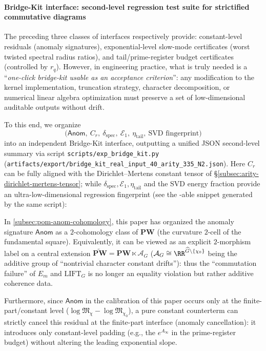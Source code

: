 \paragraph{Bridge-Kit interface: second-level regression test suite for strictified commutative diagrams}
The preceding three classes of interfaces respectively provide: constant-level residuals (anomaly signatures), exponential-level slow-mode certificates (worst twisted spectral radius ratios), and tail/prime-register budget certificates (controlled by \(r_q\)).
However, in engineering practice, what is truly needed is a ``\emph{one-click bridge-kit usable as an acceptance criterion}'': any modification to the kernel implementation, truncation strategy, character decomposition, or numerical linear algebra optimization must preserve a set of low-dimensional auditable outputs without drift.
\par
To this end, we organize
\[
\bigl(\mathsf{Anom},\ C_r,\ \delta_{\mathrm{spec}},\ \mathcal{E}_1,\ \eta_{\mathrm{tail}},\ \text{SVD fingerprint}\bigr)
\]
into an independent Bridge-Kit interface, outputting a unified JSON second-level summary via script
\texttt{scripts/exp\_bridge\_kit.py}
(\texttt{artifacts/export/bridge\_kit\_real\_input\_40\_arity\_335\_N2.json}).
Here \(C_r\) can be fully aligned with the Dirichlet--Mertens constant tensor of \S\ref{subsec:arity-dirichlet-mertens-tensor}; while \(\delta_{\mathrm{spec}},\mathcal{E}_1,\eta_{\mathrm{tail}}\) and the SVD energy fraction provide an ultra-low-dimensional regression fingerprint (see the \verb||-able snippet generated by the same script):


\begin{remark}\label{rem:pom-bridge-kit-strictification}
In \ref{subsec:pom-anom-cohomology}, this paper has organized the anomaly signature \(\mathsf{Anom}\) as a \(2\)-cohomology class of \(\mathbf{PW}\) (the curvature \(2\)-cell of the fundamental square). Equivalently, it can be viewed as an explicit \(2\)-morphism label on a central extension
\(
\widetilde{\mathbf{PW}}=\mathbf{PW}\ltimes \mathcal{A}_G
\)
(\(\mathcal{A}_G\cong\RR^{\widehat G\setminus\{\chi_0\}}\) being the additive group of ``nontrivial character constant drifts''): thus the ``commutation failure'' of \(E_m\) and \(\mathrm{LIFT}_G\) is no longer an equality violation but rather additive coherence data.
\par
Furthermore, since \(\mathsf{Anom}\) in the calibration of this paper occurs only at the finite-part/constant level (\(\log\mathfrak{M}_\chi-\log\mathfrak{M}_{\chi_0}\)), a pure constant counterterm can strictly cancel this residual at the finite-part interface (anomaly cancellation): it introduces only constant-level padding (e.g., the \(e^{A_\infty}\) in the prime-register budget) without altering the leading exponential slope.
\end{remark}

